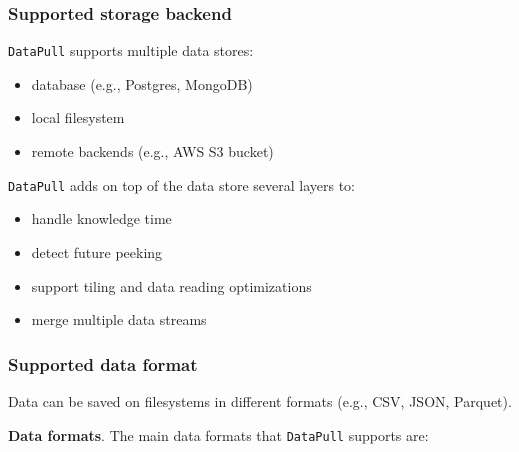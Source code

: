 \documentclass[11pt, reqno]{amsart}
\def\tightlist{}
\theoremstyle{definition}
\theoremstyle{remark}
\begin{document}
  \subsubsection{Supported storage backend}

  \verb|DataPull| supports multiple data stores:

  \begin{itemize}
    \item database (e.g., Postgres, MongoDB)

    \item local filesystem

    \item remote backends (e.g., AWS S3 bucket)
  \end{itemize}

  \verb|DataPull| adds on top of the data store several layers to:

  \begin{itemize}
    \tightlist

    \item handle knowledge time

    \item detect future peeking

    \item support tiling and data reading optimizations

    \item merge multiple data streams
  \end{itemize}

  \subsubsection{Supported data format}

  Data can be saved on filesystems in different formats (e.g., CSV, JSON, Parquet).

  \textbf{Data formats}. The main data formats that \verb|DataPull| supports are:
\end{document}
